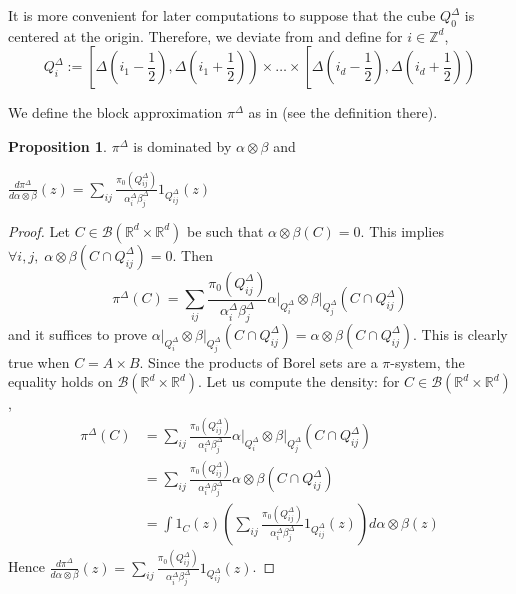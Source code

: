\documentclass[12pt]{report}
\theoremstyle{definition}
\newtheorem{prop}[defi]{Proposition}
\theoremstyle{remark}
\begin{document}
It is more convenient for later computations to suppose that the cube $Q_0^\Delta$ is centered at the origin. Therefore, we deviate from \cite{genevay2018sample} and define for $i\in \mathbb Z^d$, $$Q_i^\Delta := \left[\Delta\left(i_1-\frac 12\right), \Delta\left(i_1+\frac 12\right)  \right)\times \ldots \times \left[\Delta\left(i_d-\frac 12\right), \Delta\left(i_d+\frac 12\right)  \right)$$

We define the block approximation $\pi^{\Delta}$ as in \cite{genevay2018sample} (see the definition there).

\begin{prop}
	$\pi^{\Delta}$ is dominated by $\alpha\otimes \beta$ and 
	\begin{center}
		$\displaystyle \frac{d\pi^\Delta}{d\alpha \otimes\beta}(z)=  \sum_{ij} \frac{\pi_0(Q_{ij}^\Delta)}{\alpha_i^\Delta\beta_j^\Delta} 1_{Q_{ij}^\Delta}(z)$
	\end{center}
\end{prop}

\begin{proof}
	Let $C\in \mathcal B(\mathbb R^d\times \mathbb R^d)$ be such that $\alpha \otimes \beta(C)=0$. This implies $\forall i,j, \;\alpha \otimes \beta(C\cap Q_{ij}^\Delta) = 0$. Then 
$$\pi^\Delta(C)= \sum_{ij} \frac{\pi_0(Q_{ij}^\Delta)}{\alpha_i^\Delta\beta_j^\Delta} \left.\alpha\right|_{Q_{i}^\Delta} \otimes \left.\beta\right|_{Q_{j}^\Delta}(C\cap Q_{ij}^\Delta)$$
and it suffices to prove  $\left.\alpha\right|_{Q_{i}^\Delta} \otimes \left.\beta\right|_{Q_{j}^\Delta}(C\cap Q_{ij}^\Delta) = \alpha \otimes \beta(C\cap Q_{ij}^\Delta)$. This is clearly true when $C=A\times B$. Since the products of Borel sets are a $\pi$-system, the equality holds on $\mathcal B(\mathbb R^d\times \mathbb R^d)$. Let us compute the density: for $C\in \mathcal B(\mathbb R^d\times \mathbb R^d)$, 
$$\begin{aligned}
	\pi^\Delta(C) 
	&= \sum_{ij} \frac{\pi_0(Q_{ij}^\Delta)}{\alpha_i^\Delta\beta_j^\Delta} \left.\alpha\right|_{Q_{i}^\Delta} \otimes \left.\beta\right|_{Q_{j}^\Delta}(C\cap Q_{ij}^\Delta) \\
	&= \sum_{ij} \frac{\pi_0(Q_{ij}^\Delta)}{\alpha_i^\Delta\beta_j^\Delta} \alpha \otimes\beta(C\cap Q_{ij}^\Delta) \\
	&= \int 1_C(z) \left(\sum_{ij} \frac{\pi_0(Q_{ij}^\Delta)}{\alpha_i^\Delta\beta_j^\Delta} 1_{Q_{ij}^\Delta}(z)\right) d\alpha \otimes\beta(z)
\end{aligned}$$
Hence $\displaystyle \frac{d\pi^\Delta}{d\alpha \otimes\beta}(z)=  \sum_{ij} \frac{\pi_0(Q_{ij}^\Delta)}{\alpha_i^\Delta\beta_j^\Delta} 1_{Q_{ij}^\Delta}(z)$.
\end{proof}
\end{document}
